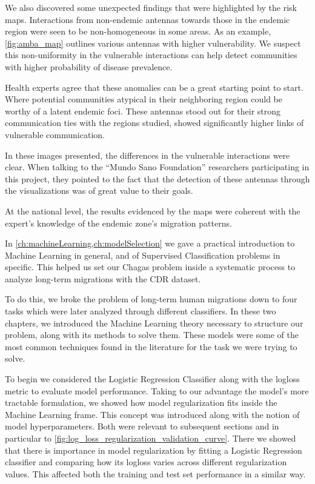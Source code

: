 We also discovered some unexpected findings that were highlighted by the risk maps.
Interactions from non-endemic antennas towards those in the endemic region were seen to be non-homogeneous in some areas.
As an example, \cref{fig:amba_map} outlines various antennas with higher vulnerability.
We suspect this non-uniformity in the vulnerable interactions can help detect communities with higher probability of disease prevalence.

Health experts agree that these anomalies can be a great starting point to start.
Where potential communities atypical in their neighboring region could be worthy of a latent endemic foci.
These antennas stood out for their strong communication ties with the regions studied, showed significantly higher links of vulnerable communication.

In these images presented, the differences in the vulnerable interactions were clear.
When talking to the ``Mundo Sano Foundation'' researchers participating in this project, they pointed to the fact that the detection of these antennas through the visualizations was of great value to their goals.


At the national level, the results evidenced by the maps were coherent with the expert's knowledge of the endemic zone's migration patterns.



In \cref{ch:machineLearning,ch:modelSelection} we gave a practical introduction to Machine Learning in general, and of Supervised Classification problems in specific.
This helped us set our Chagas problem inside a systematic process to analyze long-term migrations with the CDR dataset.

To do this, we broke the problem of long-term human migrations down to four tasks which were later analyzed through different classifiers.
In these two chapters, we introduced the Machine Learning theory necessary to structure our problem, along with its methods to solve them.
These models were some of the most common techniques found in the literature for the task we were trying to solve.

To begin we considered the Logistic Regression Classifier along with the logloss metric to evaluate model performance.
Taking to our advantage the model's more tractable formulation, we showed how model regularization fits inside the Machine Learning frame.
This concept was introduced along with the notion of model hyperparameters.
Both were relevant to subsequent sections and in particular to \cref{fig:log_loss_regularization_validation_curve}.
There we showed that there is importance in model regularization by fitting a Logistic Regression classifier and comparing how its logloss varies across different regularization values.
This affected both the training and test set performance in a similar way.


